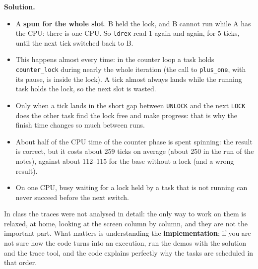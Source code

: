 \textbf{Solution.}
\begin{itemize}
    \item A \textbf{spun for the whole slot}. B held the lock, and B cannot run while A has the CPU: there is one CPU. So \texttt{ldrex} read 1 again and again, for 5 ticks, until the next tick switched back to B.
    \item This happens almost every time: in the counter loop a task holds \texttt{counter\_lock} during nearly the whole iteration (the call to \texttt{plus\_one}, with its pause, is inside the lock). A tick almost always lands while the running task holds the lock, so the next slot is wasted.
    \item Only when a tick lands in the short gap between \texttt{UNLOCK} and the next \texttt{LOCK} does the other task find the lock free and make progress: that is why the finish time changes so much between runs.
    \item About half of the CPU time of the counter phase is spent spinning: the result is correct, but it costs about 259 ticks on average (about 250 in the run of the notes), against about 112--115 for the base without a lock (and a wrong result).
    \item On one CPU, busy waiting for a lock held by a task that is not running can never succeed before the next switch.
\end{itemize}
In class the traces were not analysed in detail: the only way to work on them is relaxed, at home, looking at the screen column by column, and they are not the important part. What matters is understanding the \textbf{implementation}; if you are not sure how the code turns into an execution, run the demos with the solution and the trace tool, and the code explains perfectly why the tasks are scheduled in that order.

